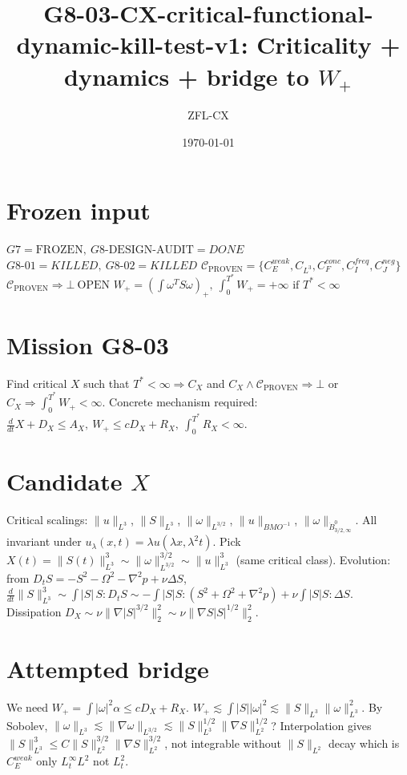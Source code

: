 \documentclass[11pt]{article}
\begin{document}
\title{G8-03-CX-critical-functional-dynamic-kill-test-v1: Criticality + dynamics + bridge to $W_+$}
\author{ZFL-CX}\date{\today}\maketitle

\section{Frozen input}
$\boxed{G7=\mathrm{FROZEN},\ G8\text{-DESIGN-AUDIT}=DONE}$
$\boxed{G8\text{-}01=KILLED,\ G8\text{-}02=KILLED}$
$\boxed{\mathcal C_{\mathrm{PROVEN}}=\{C_E^{weak},C_{L^3},C_F^{conc},C_I^{freq},C_J^{neg}\}}$
$\boxed{\mathcal C_{\mathrm{PROVEN}}\Rightarrow\bot\ \mathrm{OPEN}}$
$\boxed{W_+=\left(\int\omega^TS\omega\right)_+,\ \int_0^{T^*}W_+=+\infty\text{ if }T^*<\infty}$

\section{Mission G8-03}
Find critical $X$ such that $\boxed{T^*<\infty\Rightarrow C_X}$ and
$\boxed{C_X\land\mathcal C_{\mathrm{PROVEN}}\Rightarrow\bot}$ or
$\boxed{C_X\Rightarrow\int_0^{T^*}W_+<\infty}$.
Concrete mechanism required:
$\boxed{\frac{d}{dt}X+D_X\le A_X,\ W_+\le cD_X+R_X,\ \int_0^{T^*}R_X<\infty}$.

\section{Candidate $X$}
Critical scalings: $\|u\|_{L^3}$, $\|S\|_{L^3}$, $\|\omega\|_{L^{3/2}}$, $\|u\|_{BMO^{-1}}$, $\|\omega\|_{\dot B^{0}_{3/2,\infty}}$.
All invariant under $u_\lambda(x,t)=\lambda u(\lambda x,\lambda^2t)$.
Pick $X(t)=\|S(t)\|_{L^3}^3\sim\|\omega\|_{L^{3/2}}^{3/2}\sim\|u\|_{L^3}^3$ (same critical class).
Evolution: from $D_tS=-S^2-\Omega^2-\nabla^2p+\nu\Delta S$,
$\frac{d}{dt}\|S\|_{L^3}^3\sim\int|S|\,S:\!D_tS\sim -\int|S|S:(S^2+\Omega^2+\nabla^2p)+\nu\int|S|S:\Delta S$.
Dissipation $D_X\sim\nu\|\nabla|S|^{3/2}\|_2^2\sim\nu\|\nabla S|S|^{1/2}\|_2^2$.

\section{Attempted bridge}
We need $W_+=\int|\omega|^2\alpha\le cD_X+R_X$.
$W_+\lesssim\int|S||\omega|^2\lesssim\|S\|_{L^3}\|\omega\|_{L^3}^2$.
By Sobolev, $\|\omega\|_{L^3}\lesssim\|\nabla\omega\|_{L^{3/2}}\lesssim\|S\|_{L^3}^{1/2}\|\nabla S\|_{L^2}^{1/2}$?
Interpolation gives $\|S\|_{L^3}^3\le C\|S\|_{L^2}^{3/2}\|\nabla S\|_{L^2}^{3/2}$, not integrable without $\|S\|_{L^2}$ decay which is $C_E^{weak}$ only $L^\infty_tL^2$ not $L^2_t$.
\end{document}
